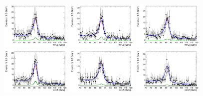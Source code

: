 \begin{figure}[!htbp]
\begin{center}
 \includegraphics[width=0.3\textwidth]{figures/modeling_xchecks/plots/ZToUpsilon1SPhoton_Cat0_signalStrenght_20/Cat0_mHZ_fit_s}
\includegraphics[width=0.3\textwidth]{figures/modeling_xchecks/plots/ZToUpsilon2SPhoton_Cat0_signalStrenght_20/Cat0_mHZ_fit_s}
\includegraphics[width=0.3\textwidth]{figures/modeling_xchecks/plots/ZToUpsilon3SPhoton_Cat0_signalStrenght_20/Cat0_mHZ_fit_s}
\includegraphics[width=0.3\textwidth]{figures/modeling_xchecks/plots/ZToUpsilon1SPhoton_Cat0_signalStrenght_50/Cat0_mHZ_fit_s}
\includegraphics[width=0.3\textwidth]{figures/modeling_xchecks/plots/ZToUpsilon2SPhoton_Cat0_signalStrenght_50/Cat0_mHZ_fit_s}
\includegraphics[width=0.3\textwidth]{figures/modeling_xchecks/plots/ZToUpsilon3SPhoton_Cat0_signalStrenght_50/Cat0_mHZ_fit_s}

\end{center}
\end{figure}
